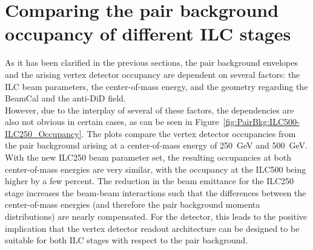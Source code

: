  
\section{Comparing the pair background occupancy of different ILC stages}
As it has been clarified in the previous sections, the pair background envelopes and the arising vertex detector occupancy are dependent on several factors:
the ILC beam parameters, the center-of-mass energy, and the \sid geometry regarding the BeamCal and the anti-DiD field.
\\However, due to the interplay of several of these factors, the dependencies are also not obvious in certain cases, as can be seen in Figure~\ref{fig:PairBkg:ILC500-ILC250_Occupancy}.
The plots compare the \sid vertex detector occupancies from the pair background arising at a center-of-mass energy of \SI{250}{\GeV} and \SI{500}{\GeV}.
With the new ILC250 beam parameter set, the resulting occupancies at both center-of-mass energies are very similar, with the occupancy at the ILC500 being higher by a few percent.
The reduction in the beam emittance for the ILC250 stage increases the beam-beam interactions such that the differences between the center-of-mass energies (and therefore the pair background momenta distributions) are nearly compensated.
For the \sid detector, this leads to the positive implication that the vertex detector readout architecture can be designed to be suitable for both ILC stages with respect to the pair background.\\
